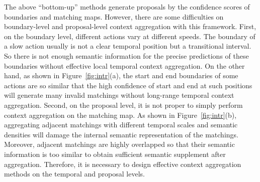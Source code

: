 \documentclass[letterpaper]{article} \usepackage{aaai22}  \usepackage{times}  \usepackage{helvet}  \usepackage{courier}  \usepackage[hyphens]{url}  \usepackage{graphicx} \urlstyle{rm} \def\UrlFont{\rm}  \usepackage{natbib}  \usepackage{caption} \DeclareCaptionStyle{ruled}{labelfont=normalfont,labelsep=colon,strut=off} \frenchspacing  \setlength{\pdfpagewidth}{8.5in}  \setlength{\pdfpageheight}{11in}  \usepackage{algorithm}
\begin{document}
The above ``bottom-up'' methods generate proposals by the confidence scores of boundaries and matching maps. 
However, there are some difficulties on boundary-level and proposal-level context aggregation with this framework. 
First, on the boundary level, different actions vary at different speeds.
The boundary of a slow action usually is not a clear temporal position but a transitional interval.
So there is not enough semantic information for the precise predictions of these boundaries without effective local temporal context aggregation.
On the other hand, as shown in Figure~\ref{fig:intr}(a), the start and end boundaries of some actions are so similar that the high confidence of start and end at such positions will generate many invalid matchings without long-range temporal context aggregation.
Second, on the proposal level, it is not proper to simply perform context aggregation on the matching map.
As shown in Figure~\ref{fig:intr}(b), aggregating adjacent matchings with different temporal scales and semantic densities will damage the internal semantic representation of the matchings.
Moreover, adjacent matchings are highly overlapped so that their semantic information is too similar to obtain sufficient semantic supplement after aggregation. 
Therefore, it is necessary to design effective context aggregation methods on the temporal and proposal levels.
\end{document}
